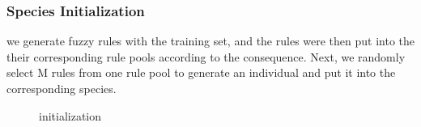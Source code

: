 \documentclass[conference,compsoc]{IEEEtran}
\begin{document}
\subsubsection {Species Initialization}
we generate fuzzy rules with the training set, and the rules were then put into the their corresponding rule pools according to the consequence. Next, we randomly select M rules from one rule pool to generate an individual and put it into the corresponding species. 
\begin{figure}[htbp]%
	\centering
	\caption{initialization}
	\label{initialization.png} 
\end{figure}
\end{document}
